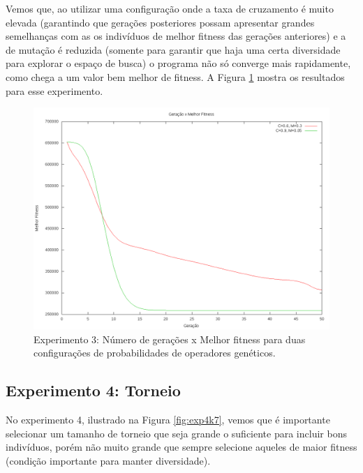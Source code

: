 \documentclass[12pt]{article}
\begin{document}
Vemos que, ao utilizar uma configuração onde a taxa de cruzamento é muito elevada (garantindo
que gerações posteriores possam apresentar grandes semelhanças com as os indivíduos de melhor
fitness das gerações anteriores) e a de mutação é reduzida (somente para garantir que haja uma certa
diversidade para explorar o espaço de busca) o programa não só converge mais rapidamente, como
chega a um valor bem melhor de fitness. A Figura \ref{fig:exp3h} mostra os resultados para esse
experimento.

\begin{figure}[ht]
  \centering
  \includegraphics[width=1\textwidth]{exp3h.png}
  \caption{Experimento 3: Número de gerações x Melhor fitness para duas configurações de probabilidades
  de operadores genéticos.}
  \label{fig:exp3h}
\end{figure}

\subsection{Experimento 4: Torneio}

No experimento 4, ilustrado na Figura \ref{fig:exp4k7}, vemos que é importante selecionar um tamanho de
torneio que seja grande o suficiente para incluir bons indivíduos, porém não muito grande que sempre 
selecione aqueles de maior fitness (condição importante para manter diversidade).
\end{document}
